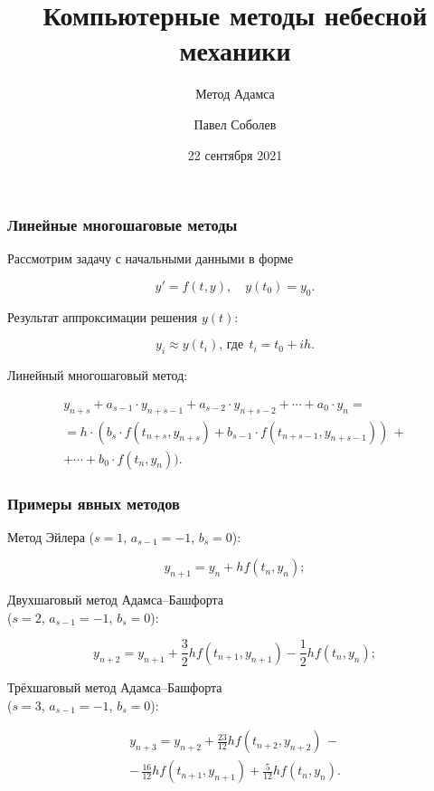 


\title{Компьютерные методы небесной механики}
\subtitle{Метод Адамса}
\author{Павел Соболев}
\date{22 сентября 2021}



\frame{\titlepage}

\begin{frame}
\frametitle{Линейные многошаговые методы}
Рассмотрим задачу с начальными данными в форме

\su
\begin{equation}
  y' = f(t, y), \quad y(t_0) = y_0.
\end{equation}

Результат аппроксимации решения $ y(t) $:

\su
\begin{equation}
  y_i \approx y(t_i), \, \text{где} \;\, t_i = t_0 + ih.
\end{equation}

Линейный многошаговый метод:

\su
\begin{equation}
\begin{gathered}
  y_{n+s} + a_{s-1} \cdot y_{n+s-1} + a_{s-2} \cdot y_{n+s-2} + \cdots + a_0 \cdot y_n = \\
  = h \cdot (b_s \cdot f(t_{n+s}, y_{n+s}) + b_{s-1} \cdot f(t_{n+s-1}, y_{n+s-1})) \, + \\
  + \cdots + b_0 \cdot f(t_n, y_n)).
\end{gathered}
\end{equation}

\end{frame}

\begin{frame}
\frametitle{Примеры явных методов}

Метод Эйлера ($s = 1$, $a_{s-1} = -1$, $b_s = 0$):

\su
\begin{equation}
  y_{n+1} = y_n + h f(t_n, y_n);
\end{equation}

Двухшаговый метод Адамса--Башфорта \\
($s = 2$, $a_{s-1} = -1$, $b_s = 0$):

\su
\begin{equation}
  y_{n+2} = y_{n+1} + \frac{3}{2} h f(t_{n+1}, y_{n+1}) - \frac{1}{2} h f(t_n, y_n);
\end{equation}

Трёхшаговый метод Адамса--Башфорта \\
($s = 3$, $a_{s-1} = -1$, $b_s = 0$):

\su
\begin{equation}
\begin{gathered}
  y_{n+3} = y_{n+2} + \frac{23}{12} h f(t_{n+2}, y_{n+2}) \, - \\
  - \, \frac{16}{12} h f(t_{n+1}, y_{n+1}) + \frac{5}{12} h f(t_n, y_n).
\end{gathered}
\end{equation}

\end{frame}

